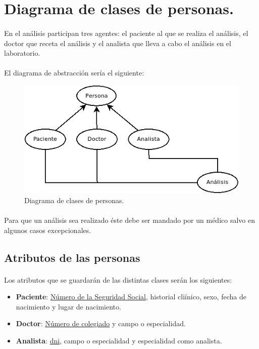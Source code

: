 \documentclass[a4paper,10pt]{article}
\begin{document}
\section{Diagrama de clases de personas.}
\paragraph{}
En el análisis participan tres agentes: el paciente al que se realiza el análisis, el doctor que receta el análisis y el analista que lleva a cabo el análisis en el laboratorio.
\paragraph{}
El diagrama de abstracción sería el siguiente:
\vspace{0.5cm}
\begin{center}
	\begin{figure}[hbt]
		\includegraphics[width=\textwidth]{diagrams/img/personas.png}
		\caption{Diagrama de clases de personas.}
		\label{fig:diagramapersonas}
	\end{figure}
\end{center}
\paragraph{}
Para que un análisis sea realizado éste debe ser mandado por un médico salvo en algunos casos excepcionales.
\subsection{Atributos de las personas}

\paragraph{}
Los atributos que se guardarán de las distintas clases serán los siguientes:
\begin{itemize}
	\item {\bf Paciente}: \underline{Número de la Seguridad Social}, historial cliínico, sexo, fecha de nacimiento y lugar de nacimiento.
	\item {\bf Doctor}: \underline{Número de colegiado} y campo o especialidad.
	\item {\bf Analista}: \underline{dni}, campo o especialidad y especialidad como analista.
\end{itemize}
\pagebreak
\end{document}

